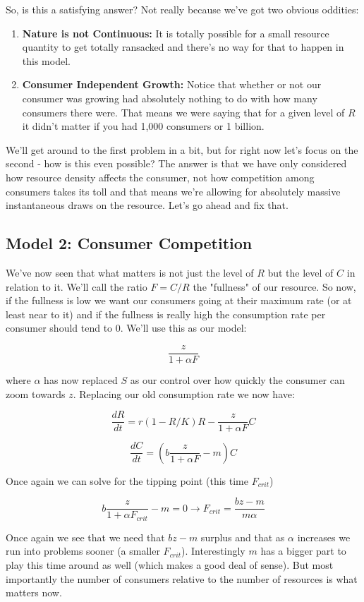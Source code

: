 \documentclass[11pt,a5paper]{book}
\begin{document}
So, is this a satisfying answer? Not really because we've got two obvious oddities:

\begin{enumerate}
\item \textbf{Nature is not Continuous:} It is totally possible for a small resource quantity to get totally ransacked and there's no way for that to happen in this model.
\item \textbf{Consumer Independent Growth:} Notice that whether or not our consumer was growing had absolutely nothing to do with how many consumers there were. That means we were saying that for a given level of $R$ it didn't matter if you had 1,000 consumers or 1 billion. 
\end{enumerate}

We'll get around to the first problem in a bit, but for right now let's focus on the second - how is this even possible? The answer is that we have only considered how resource density affects the consumer, not how competition among consumers takes its toll and that means we're allowing for absolutely massive instantaneous draws on the resource. Let's go ahead and fix that. 

\subsection{Model 2: Consumer Competition}

We've now seen that what matters is not just the level of $R$ but the level of $C$ in relation to it. We'll call the ratio $F=C/R$ the "fullness" of our resource. So now, if the fullness is low we want our consumers going at their maximum rate (or at least near to it) and if the fullness is really high the consumption rate per consumer should tend to 0. We'll use this as our model:

$$\frac{z}{1+\alpha F}$$

where $\alpha$ has now replaced $S$ as our control over how quickly the consumer can zoom towards $z$. Replacing our old consumption rate we now have:

$$\frac{dR}{dt} = r(1-R/K)R-\frac{z}{1+\alpha F}C$$

$$\frac{dC}{dt} = \left(b\frac{z}{1+\alpha F}-m\right)C$$

Once again we can solve for the tipping point (this time $F_{crit}$)

$$b\frac{z}{1+\alpha F_{crit}}-m=0 \rightarrow F_{crit} = \frac{bz-m}{m\alpha}$$

Once again we see that we need that $bz-m$ surplus and that as $\alpha$ increases we run into problems sooner (a smaller $F_{crit}$). Interestingly $m$ has a bigger part to play this time around as well (which makes a good deal of sense). But most importantly the number of consumers relative to the number of resources is what matters now. 
\end{document}
